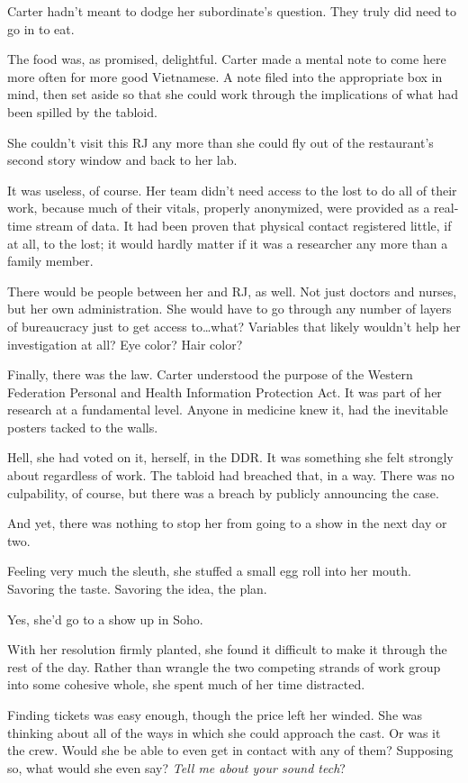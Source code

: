 Carter hadn't meant to dodge her subordinate's question. They truly did need to go in to eat.

The food was, as promised, delightful. Carter made a mental note to come here more often for more good Vietnamese. A note filed into the appropriate box in mind, then set aside so that she could work through the implications of what had been spilled by the tabloid.

She couldn't visit this RJ any more than she could fly out of the restaurant's second story window and back to her lab.

It was useless, of course. Her team didn't need access to the lost to do all of their work, because much of their vitals, properly anonymized, were provided as a real-time stream of data. It had been proven that physical contact registered little, if at all, to the lost; it would hardly matter if it was a researcher any more than a family member.

There would be people between her and RJ, as well. Not just doctors and nurses, but her own administration. She would have to go through any number of layers of bureaucracy just to get access to\ldots{}what? Variables that likely wouldn't help her investigation at all? Eye color? Hair color?

Finally, there was the law. Carter understood the purpose of the Western Federation Personal and Health Information Protection Act. It was part of her research at a fundamental level. Anyone in medicine knew it, had the inevitable posters tacked to the walls.

Hell, she had voted on it, herself, in the DDR. It was something she felt strongly about regardless of work. The tabloid had breached that, in a way. There was no culpability, of course, but there was a breach by publicly announcing the case.

And yet, there was nothing to stop her from going to a show in the next day or two.

Feeling very much the sleuth, she stuffed a small egg roll into her mouth. Savoring the taste. Savoring the idea, the plan.

Yes, she'd go to a show up in Soho.

With her resolution firmly planted, she found it difficult to make it through the rest of the day. Rather than wrangle the two competing strands of work group into some cohesive whole, she spent much of her time distracted.

Finding tickets was easy enough, though the price left her winded. She was thinking about all of the ways in which she could approach the cast. Or was it the crew. Would she be able to even get in contact with any of them? Supposing so, what would she even say? \emph{Tell me about your sound tech}?

